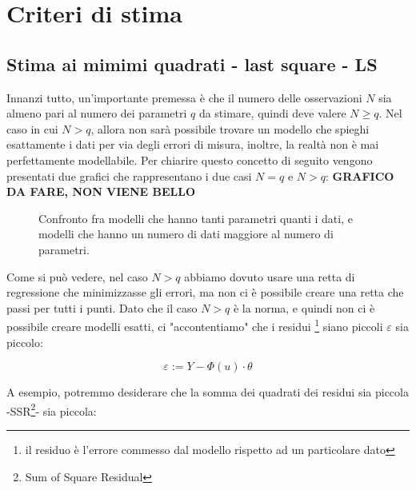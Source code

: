 \section{Criteri di stima}
\subsection{Stima ai mimimi quadrati - last square - LS}
Innanzi tutto, un'importante premessa è che il numero delle osservazioni $N$ sia almeno pari al numero dei parametri $q$ da stimare, quindi deve valere $N\geq q$. Nel caso in cui $N>q$, allora non sarà possibile trovare un modello che spieghi esattamente i dati per via degli errori di misura, inoltre, la realtà non è mai perfettamente modellabile. Per chiarire questo concetto di seguito vengono presentati due grafici che rappresentano i due casi $N=q$ e $N>q$:
\textbf{GRAFICO DA FARE, NON VIENE BELLO}
\begin{figure}[htbp]
  \centering
  
  
  \caption{Confronto fra modelli che hanno tanti parametri quanti i dati, e modelli che hanno un numero di dati maggiore al numero di parametri.\label{fig:confrontomodellidatiparametri}}
\end{figure}

Come si può vedere, nel caso $N>q$ abbiamo dovuto usare una retta di regressione che minimizzasse gli errori, ma non ci è possibile creare una retta che passi per tutti i punti. Dato che il caso $N>q$ è la norma, e quindi non ci è possibile creare modelli esatti, ci "accontentiamo" che i residui \footnote{il residuo è l'errore commesso dal modello rispetto ad un particolare dato} siano piccoli $\varepsilon$ sia piccolo:

  \[ \varepsilon :=Y-\Phi(u)\cdot \theta \]
  
A esempio, potremmo desiderare che la somma dei quadrati dei residui sia piccola -SSR\footnote{Sum of Square Residual}-  sia piccola:

